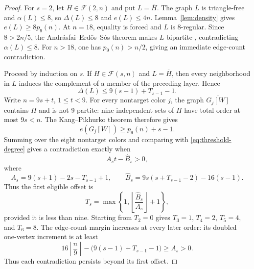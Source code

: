 \documentclass[11pt,reqno,a4paper]{amsart}
\theoremstyle{definition}
\theoremstyle{remark}
\newcommand{\comp}[1]{\overline{#1}}
\newcommand{\cF}{\mathcal F}
\begin{document}
\begin{proof}
For $s=2$, let $H\in\cF(2,n)$ and put $L=\comp H$. The graph $L$ is
triangle-free and $\alpha(L)\le8$, so $\Delta(L)\le8$ and
$e(L)\le4n$. Lemma~\ref{lem:density} gives
$e(L)\ge8p_9(n)$. At $n=18$, equality is forced and $L$ is
8-regular. Since $8>2n/5$, the Andrásfai--Erd\H{o}s--S\'os theorem
makes $L$ bipartite \cite{AndrasfaiErdosSos1974}, contradicting
$\alpha(L)\le8$. For $n>18$, one has $p_9(n)>n/2$, giving an
immediate edge-count contradiction.

Proceed by induction on $s$. If $H\in\cF(s,n)$ and $L=\comp H$, then
every neighborhood in $L$ induces the complement of a member of the
preceding layer. Hence
\begin{equation}\label{eq:threshold-degree}
 \Delta(L)\le9(s-1)+T_{s-1}-1.
\end{equation}
Write $n=9s+t$, $1\le t<9$. For every nontarget color $j$, the graph
$\comp{G_j[W]}$ contains $H$ and is not 9-partite: nine independent
sets of $H$ have total order at most $9s<n$. The
Kang--Pikhurko theorem therefore gives
\[
 e(G_j[W])\ge p_9(n)+s-1.
\]
Summing over the eight nontarget colors and comparing with
\eqref{eq:threshold-degree} gives a contradiction exactly when
\[
 A_st-\widehat B_s>0,
\]
where
\[
 A_s=9(s+1)-2s-T_{s-1}+1,\qquad
 \widehat B_s=9s(s+T_{s-1}-2)-16(s-1).
\]
Thus the first eligible offset is
\[
 T_s=\max\left\{1,
 \left\lfloor\frac{\widehat B_s}{A_s}\right\rfloor+1\right\},
\]
provided it is less than nine. Starting from $T_2=0$ gives
$T_3=1$, $T_4=2$, $T_5=4$, and $T_6=8$. The edge-count margin
increases at every later order: its doubled one-vertex increment is at
least
\[
 16\left\lfloor\frac n9\right\rfloor-
 \bigl(9(s-1)+T_{s-1}-1\bigr)\ge A_s>0.
\]
Thus each contradiction persists beyond its first offset.
\end{proof}
\end{document}
